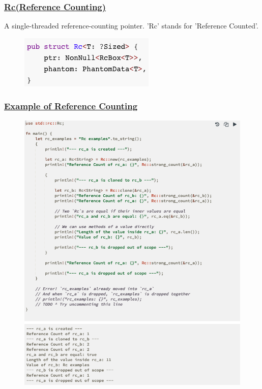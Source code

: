 % 
% 
% 
% 
% 
% 
\begin{frame}[fragile]
    \frametitle{\href{https://doc.rust-lang.org/rust-by-example/std/rc.html}{Rc(Reference Counting)}}

A single-threaded reference-counting pointer. 'Rc' stands for 'Reference Counted'.

 \pause
 
    \begin{figure}
    \includegraphics[width=0.4\linewidth]{figs/struct-rc.png}
    \end{figure}

\end{frame}
% 
% 
% 
% 
% 
% 
\begin{frame}[fragile]
    \frametitle{\href{https://doc.rust-lang.org/rust-by-example/std/rc.html}{Example of Reference Counting}}
    \begin{figure}
    \includegraphics[width=0.37\linewidth]{figs/rc-example.png}
    \end{figure}

\end{frame}
